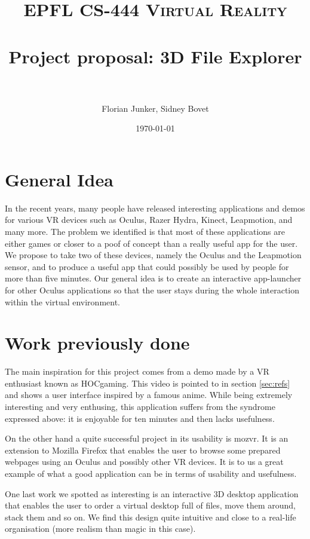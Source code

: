 \documentclass[paper=a4, fontsize=11pt]{scrartcl} %
\title{
  \normalfont \normalsize
  \textsc{EPFL CS-444 Virtual Reality} \\ [25pt] %
  \horrule{0.5pt} \\[0.4cm] %
  \huge Project proposal: 3D File Explorer \\ %
  \horrule{2pt} \\[0.5cm] %
}
\author{Florian Junker, Sidney Bovet} %
\date{\normalsize\today} %
\numberwithin{equation}{section} %
\numberwithin{figure}{section} %
\numberwithin{table}{section} %
\begin{document}
\maketitle %


\section{General Idea}

In the recent years, many people have released interesting applications and demos for various VR devices such as Oculus, Razer Hydra, Kinect, Leapmotion, and many more. The problem we identified is that most of these applications are either games or closer to a poof of concept than a really useful app for the user. We propose to take two of these devices, namely the Oculus and the Leapmotion sensor, and to produce a useful app that could possibly be used by people for more than five minutes. Our general idea is to create an interactive app-launcher for other Oculus applications so that the user stays during the whole interaction within the virtual environment.


\section{Work previously done}

The main inspiration for this project comes from a demo made by a VR enthusiast known as HOCgaming. This video is pointed to in section \ref{sec:refs} and shows a user interface inspired by a famous anime. While being extremely interesting and very enthusing, this application suffers from the syndrome expressed above: it is enjoyable for ten minutes and then lacks usefulness.

On the other hand a quite successful project in its usability is mozvr. It is an extension to Mozilla Firefox that enables the user to browse some prepared webpages using an Oculus and possibly other VR devices. It is to us a great example of what a good application can be in terms of usability and usefulness.

One last work we spotted as interesting is an interactive 3D desktop application that enables the user to order a virtual desktop full of files, move them around, stack them and so on. We find this design quite intuitive and close to a real-life organisation (more realism than magic in this case).
\end{document}
